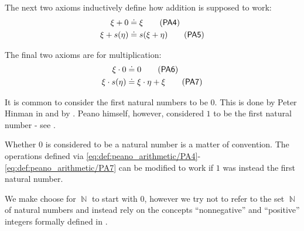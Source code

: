 \begin{definition}
  \begin{thmenum}[resume=def:peano_arithmetic]
     The next two axioms inductively define how addition is supposed to work:
    \begin{align}
      \xi + 0       &\doteq \xi           \label{eq:def:peano_arithmetic/PA4}\tag{\logic{PA4}} \\
      \xi + s(\eta) &\doteq s(\xi + \eta) \label{eq:def:peano_arithmetic/PA5}\tag{\logic{PA5}}
    \end{align}

     The final two axioms are for multiplication:
    \begin{align}
      \xi \cdot 0       &\doteq 0                    \label{eq:def:peano_arithmetic/PA6}\tag{\logic{PA6}} \\
      \xi \cdot s(\eta) &\doteq \xi \cdot \eta + \xi \label{eq:def:peano_arithmetic/PA7}\tag{\logic{PA7}}
    \end{align}
  \end{thmenum}
\end{definition}

\begin{remark}\label{rem:peano_arithmetic_zero}
  It is common to consider the first natural numbers to be \( 0 \). This is done by Peter Hinman in  and by . Peano himself, however, considered \( 1 \) to be the first natural number - see \cite[1]{Peano1889}.

  Whether \( 0 \) is considered to be a natural number is a matter of convention. The operations defined via \eqref{eq:def:peano_arithmetic/PA4}-\eqref{eq:def:peano_arithmetic/PA7} can be modified to work if \( 1 \) was instead the first natural number.

  We make choose for \( \BbbN \) to start with \( 0 \), however we try not to refer to the set \( \BbbN \) of natural numbers and instead rely on the concepts \enquote{nonnegative} and \enquote{positive} integers formally defined in .
\end{remark}

